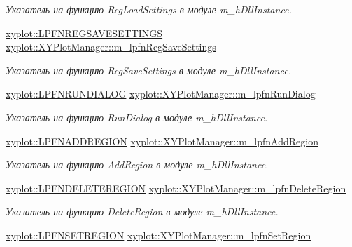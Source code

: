 \begin{DoxyCompactItemize}
\begin{DoxyCompactList}\small\item\em Указатель на функцию Reg\-Load\-Settings в модуле m\-\_\-h\-Dll\-Instance. \end{DoxyCompactList}\item 
\hyperlink{namespacexyplot_a852637cd21abfcac7de9635bbd175db7}{xyplot\-::\-L\-P\-F\-N\-R\-E\-G\-S\-A\-V\-E\-S\-E\-T\-T\-I\-N\-G\-S} \hyperlink{group__gr_func_pointers_gacb18df7cd092a71ad121f55d047da5dc}{xyplot\-::\-X\-Y\-Plot\-Manager\-::m\-\_\-lpfn\-Reg\-Save\-Settings}
\begin{DoxyCompactList}\small\item\em Указатель на функцию Reg\-Save\-Settings в модуле m\-\_\-h\-Dll\-Instance. \end{DoxyCompactList}\item 
\hyperlink{namespacexyplot_a63fcd576a6d31af2655357ffa3ea7b74}{xyplot\-::\-L\-P\-F\-N\-R\-U\-N\-D\-I\-A\-L\-O\-G} \hyperlink{group__gr_func_pointers_ga6ee84aa8c78971f94a8abb1bd5ed9558}{xyplot\-::\-X\-Y\-Plot\-Manager\-::m\-\_\-lpfn\-Run\-Dialog}
\begin{DoxyCompactList}\small\item\em Указатель на функцию Run\-Dialog в модуле m\-\_\-h\-Dll\-Instance. \end{DoxyCompactList}\item 
\hyperlink{namespacexyplot_a0aaffe16c53538a1e712cdc6caef070f}{xyplot\-::\-L\-P\-F\-N\-A\-D\-D\-R\-E\-G\-I\-O\-N} \hyperlink{group__gr_func_pointers_gaccaf69dea4abee8034cf3d7e4164ac3d}{xyplot\-::\-X\-Y\-Plot\-Manager\-::m\-\_\-lpfn\-Add\-Region}
\begin{DoxyCompactList}\small\item\em Указатель на функцию Add\-Region в модуле m\-\_\-h\-Dll\-Instance. \end{DoxyCompactList}\item 
\hyperlink{namespacexyplot_ad184f4d62ca85e471cef796c79dd0b4c}{xyplot\-::\-L\-P\-F\-N\-D\-E\-L\-E\-T\-E\-R\-E\-G\-I\-O\-N} \hyperlink{group__gr_func_pointers_gaf02bf6794063914ee9dbe34fb0d29c0e}{xyplot\-::\-X\-Y\-Plot\-Manager\-::m\-\_\-lpfn\-Delete\-Region}
\begin{DoxyCompactList}\small\item\em Указатель на функцию Delete\-Region в модуле m\-\_\-h\-Dll\-Instance. \end{DoxyCompactList}\item 
\hyperlink{namespacexyplot_a048931557c2d0bfaa041629319bb118d}{xyplot\-::\-L\-P\-F\-N\-S\-E\-T\-R\-E\-G\-I\-O\-N} \hyperlink{group__gr_func_pointers_gae81937286e2936ec1f24abfd7334c364}{xyplot\-::\-X\-Y\-Plot\-Manager\-::m\-\_\-lpfn\-Set\-Region}

\end{DoxyCompactItemize}
